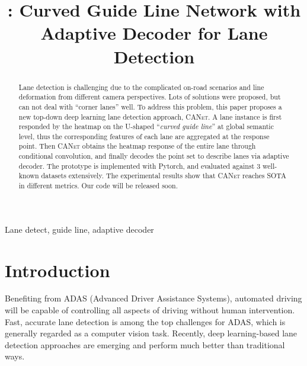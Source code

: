 \documentclass{article}
\title{\self: Curved Guide Line Network with Adaptive Decoder for Lane Detection}
\newcommand\self{\textsc{CANet}\xspace}
\begin{document}
\maketitle
\begin{abstract}
  Lane detection is challenging due to the complicated on-road scenarios and line deformation from different camera perspectives. Lots of solutions were proposed, but can not deal with ``corner lanes'' well. To address this problem, this paper proposes a new top-down deep learning lane detection approach, \self. A lane instance is first responded by the heatmap on the U-shaped ``\emph{curved guide line}'' at global semantic level, thus the corresponding features of each lane are aggregated at the response point. Then \self obtains the heatmap response of the entire lane through conditional convolution, and finally decodes the point set to describe lanes via adaptive decoder. The prototype is implemented with Pytorch, and evaluated against 3 well-known datasets extensively. The experimental results show that \self reaches SOTA in different metrics. Our code will be released soon.
\end{abstract}
\begin{keywords}
Lane detect, guide line, adaptive decoder
\end{keywords}
\section{Introduction}
\label{sec:intro}
Benefiting from ADAS (Advanced Driver Assistance Systems), automated driving
will be capable of controlling all aspects of driving without human
intervention. Fast, accurate lane detection is among the top challenges for
ADAS, which is generally regarded as a computer vision task. Recently, deep learning-based lane detection approaches are emerging and perform much better than traditional ways.
\end{document}
